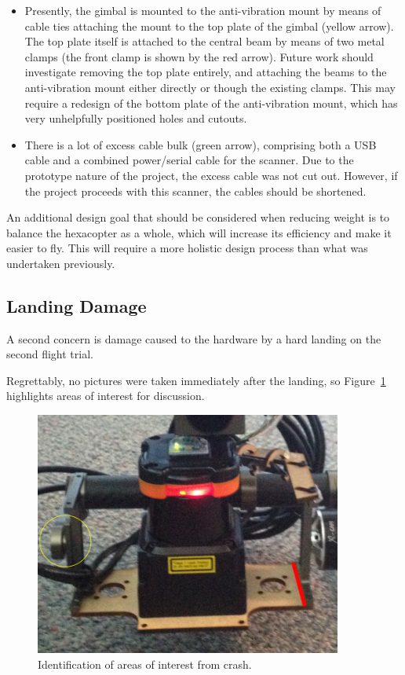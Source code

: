 \documentclass[12pt,oneside,a4paper]{book}
\begin{document}
\begin{itemize}
\item Presently, the gimbal is mounted to the anti-vibration mount by
  means of cable ties attaching the mount to the top plate of the
  gimbal (yellow arrow). The top plate itself is attached to the
  central beam by means of two metal clamps (the front clamp is shown
  by the red arrow). Future work should investigate removing the top
  plate entirely, and attaching the beams to the anti-vibration mount
  either directly or though the existing clamps. This may require a
  redesign of the bottom plate of the anti-vibration mount, which has
  very unhelpfully positioned holes and cutouts.
\item There is a lot of excess cable bulk (green arrow), comprising
  both a USB cable and a combined power/serial cable for the
  scanner. Due to the prototype nature of the project, the excess
  cable was not cut out. However, if the project proceeds with this
  scanner, the cables should be shortened.
\end{itemize}

An additional design goal that should be considered when reducing
weight is to balance the hexacopter as a whole, which will increase
its efficiency and make it easier to fly. This will require a
more holistic design process than what was undertaken previously.

\subsection{Landing Damage}
\label{sec:landing-damage}


A second concern is damage caused to the hardware by a hard landing on
the second flight trial.

Regrettably, no pictures were taken immediately after the landing, so
Figure~\ref{fig:damage} highlights areas of interest for discussion.

\begin{figure}[h!]
  \centering
  \includegraphics[width=0.9\textwidth]{figs/damage}
  \caption{Identification of areas of interest from crash.}
  \label{fig:damage}
\end{figure}
\end{document}
